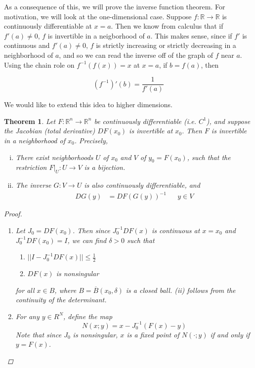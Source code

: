 \documentclass{article}
\newtheorem{theorem}{Theorem}[section]
\def\R{{\mathbb R}}
\begin{document}
As a consequence of this, we will prove the inverse function theorem. For motivation, we will look at the one-dimensional case. Suppose $f: \R \rightarrow \R$ is continuously differentiable at $x = a$. Then we know from calculus that if $f'(a) \neq 0$, $f$ is invertible in a neigborhood of $a$. This makes sense, since if $f'$ is continuous and $f'(a) \neq 0$, $f$ is strictly increasing or strictly decreasing in a neighborhood of $a$, and so we can read the inverse off of the graph of $f$ near $a$. Using the chain role on $f^{-1}(f(x)) = x$ at $x = a$, if $b = f(a)$, then

\[
(f^{-1})'(b) = \frac{1}{f'(a)}
\]

We would like to extend this idea to higher dimensions.

\begin{theorem}
Let $F: \R^n \rightarrow \R^n$ be continuously differentiable (i.e. $C^1$), and suppose the Jacobian (total derivative) $DF(x_0)$ is invertible at $x_0$. Then $F$ is invertible in a neighborhood of $x_0$. Precisely,

\begin{enumerate}[(i)]
\item There exist neighborhoods $U$ of $x_0$ and $V$ of $y_0 = F(x_0)$, such that the restriction $F|_U: U \rightarrow V$ is a bijection.
\item The inverse $G: V \rightarrow U$ is also continuously differentiable, and
\begin{align}
DG(y) &= DF(G(y))^{-1} && y \in V
\end{align}
\end{enumerate}

\begin{proof}
\begin{enumerate}

\item Let $J_0 = DF(x_0)$. Then since $J_0^{-1} DF(x)$ is continuous at $x = x_0$ and $J_0^{-1} DF(x_0) = I$, we can find $\delta > 0$ such that

\begin{enumerate}
\item $||I - J_0^{-1} DF(x)|| \leq \frac{1}{2}$
\item $DF(x)$ is nonsingular
\end{enumerate}

for all $x \in B$, where $B = \overline{B}(x_0, \delta)$ is a closed ball. (ii) follows from the continuity of the determinant.

\item For any $y \in R^N$, define the map
\begin{equation}
N(x; y) = x - J_0^{-1}(F(x) - y)
\end{equation}
Note that since $J_0$ is nonsingular, $x$ is a fixed point of $N(\cdot; y)$ if and only if $y = F(x)$.


\end{enumerate}
\end{proof}
\end{theorem}
\end{document}
